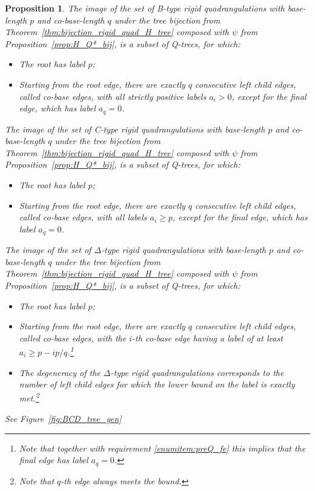 \documentclass[11pt]{article}
\theoremstyle{plain}
\newtheorem{proposition}[theorem]{Proposition}
\theoremstyle{definition}
\begin{document}
\begin{proposition}\label{prop:BCD_disk_to_Qtree}
The image of the set of B-type rigid quadrangulations with base-length $p$ and co-base-length $q$ under the tree bijection from Theorem~\ref{thm:bijection_rigid_quad_H_tree} composed with $\psi$ from Proposition~\ref{prop:H_Q*_bij}, is a subset of Q-trees, for which:
\begin{itemize}[nosep]
    \item The root has label $p$;
    \item Starting from the root edge, there are exactly $q$ consecutive left child edges, called co-base edges, with all strictly positive labels $a_i>0$, except for the final edge, which has label $a_q=0$.
\end{itemize}

\noindent The image of the set of C-type rigid quadrangulations with base-length $p$ and co-base-length $q$ under the tree bijection from Theorem~\ref{thm:bijection_rigid_quad_H_tree} composed with $\psi$ from Proposition~\ref{prop:H_Q*_bij}, is a subset of Q-trees, for which:
\begin{itemize}[nosep]
    \item The root has label $p$;
    \item Starting from the root edge, there are exactly $q$ consecutive left child edges, called co-base edges, with all labels $a_i\geq p$, except for the final edge, which has label $a_q=0$.
\end{itemize}

\noindent The image of the set of $\Delta$-type rigid quadrangulations with base-length $p$ and co-base-length $q$ under the tree bijection from Theorem~\ref{thm:bijection_rigid_quad_H_tree} composed with $\psi$ from Proposition~\ref{prop:H_Q*_bij}, is a subset of Q-trees, for which:
\begin{itemize}[nosep]
    \item The root has label $p$;
    \item Starting from the root edge, there are exactly $q$ consecutive left child edges, called co-base edges, with the $i$-th co-base edge having a label of at least $a_i\geq p-i p/q$.\footnote{Note that together with requirement \ref{enumitem:preQ_fe} this implies that the final edge has label $a_q=0$.}
    \item The degeneracy of the $\Delta$-type rigid quadrangulations corresponds to the number of left child edges for which the lower bound on the label is exactly met.\footnote{Note that $q$-th edge always meets the bound.} 
\end{itemize}
See Figure~\ref{fig:BCD_tree_gen}
\end{proposition}
\end{document}
